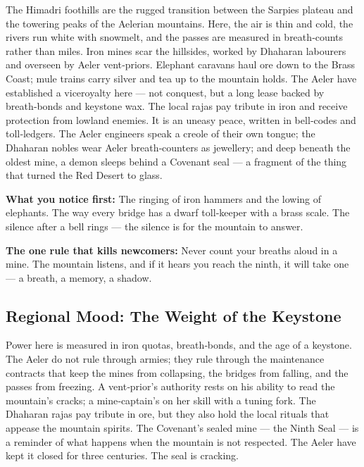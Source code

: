 \vspace{2mm}
\begin{tcolorbox}[colback=black!3,colframe=blue!60!black,title={Theme \& Atmosphere}]
The Himadri foothills are the rugged transition between the Sarpies plateau and the towering peaks of the Aelerian mountains. Here, the air is thin and cold, the rivers run white with snowmelt, and the passes are measured in breath‑counts rather than miles. Iron mines scar the hillsides, worked by Dhaharan labourers and overseen by Aeler vent‑priors. Elephant caravans haul ore down to the Brass Coast; mule trains carry silver and tea up to the mountain holds. The Aeler have established a viceroyalty here — not conquest, but a long lease backed by breath‑bonds and keystone wax. The local rajas pay tribute in iron and receive protection from lowland enemies. It is an uneasy peace, written in bell‑codes and toll‑ledgers. The Aeler engineers speak a creole of their own tongue; the Dhaharan nobles wear Aeler breath‑counters as jewellery; and deep beneath the oldest mine, a demon sleeps behind a Covenant seal — a fragment of the thing that turned the Red Desert to glass.

\vspace{2mm}
\textbf{What you notice first:} The ringing of iron hammers and the lowing of elephants. The way every bridge has a dwarf toll‑keeper with a brass scale. The silence after a bell rings — the silence is for the mountain to answer.

\textbf{The one rule that kills newcomers:} Never count your breaths aloud in a mine. The mountain listens, and if it hears you reach the ninth, it will take one — a breath, a memory, a shadow.
\end{tcolorbox}

\subsection*{Regional Mood: The Weight of the Keystone}

Power here is measured in iron quotas, breath‑bonds, and the age of a keystone. The Aeler do not rule through armies; they rule through the maintenance contracts that keep the mines from collapsing, the bridges from falling, and the passes from freezing. A vent‑prior's authority rests on his ability to read the mountain's cracks; a mine‑captain's on her skill with a tuning fork. The Dhaharan rajas pay tribute in ore, but they also hold the local rituals that appease the mountain spirits. The Covenant's sealed mine — the Ninth Seal — is a reminder of what happens when the mountain is not respected. The Aeler have kept it closed for three centuries. The seal is cracking.


